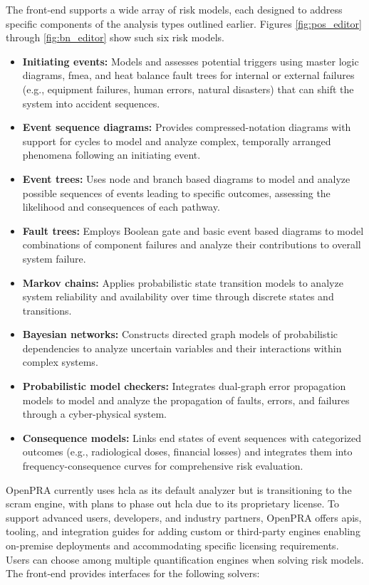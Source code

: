 

The front-end supports a wide array of risk models, each designed to address specific components of the analysis types outlined earlier. Figures \ref{fig:pos_editor} through \ref{fig:bn_editor} show such six risk models.

\begin{itemize}
  \item \textbf{Initiating events:} Models and assesses potential triggers using master logic diagrams, \acrshort{fmea}, and heat balance fault trees for internal or external failures (e.g., equipment failures, human errors, natural disasters) that can shift the system into accident sequences.
  \item \textbf{Event sequence diagrams:} Provides compressed-notation diagrams with support for cycles to model and analyze complex, temporally arranged phenomena following an initiating event.
  \item \textbf{Event trees:} Uses node and branch based diagrams to model and analyze possible sequences of events leading to specific outcomes, assessing the likelihood and consequences of each pathway.
  \item \textbf{Fault trees:} Employs Boolean gate and basic event based diagrams to model combinations of component failures and analyze their contributions to overall system failure.
  \item \textbf{Markov chains:} Applies probabilistic state transition models to analyze system reliability and availability over time through discrete states and transitions.
  \item \textbf{Bayesian networks:} Constructs directed graph models of probabilistic dependencies to analyze uncertain variables and their interactions within complex systems.
  \item \textbf{Probabilistic model checkers:} Integrates dual-graph error propagation models to model and analyze the propagation of faults, errors, and failures through a cyber-physical system.
  \item \textbf{Consequence models:} Links end states of event sequences with categorized outcomes (e.g., radiological doses, financial losses) and integrates them into frequency-consequence curves for comprehensive risk evaluation.
\end{itemize}



OpenPRA currently uses \acrshort{hcla} as its default analyzer but is transitioning to the scram engine, with plans to phase out \acrfull{hcla} due to its proprietary license. To support advanced users, developers, and industry partners, OpenPRA offers \acrfull{api}s, tooling, and integration guides for adding custom or third-party engines enabling on-premise deployments and accommodating specific licensing requirements. Users can choose among multiple quantification engines when solving risk models. The front-end provides interfaces for the following solvers:

